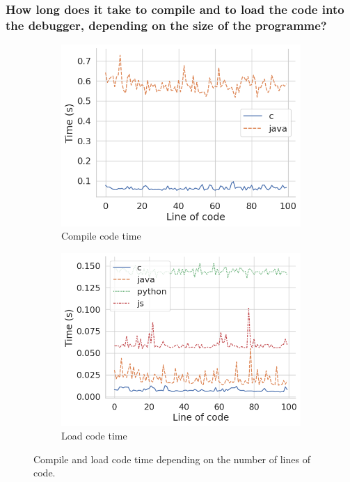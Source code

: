 \documentclass[english,submission]{programming}
\begin{document}
\subsubsection{How long does it take to compile and to load the code into the debugger, depending on the size of the programme?}

\begin{figure}[htbp]
  \centering
  \begin{subfigure}[b]{0.48\textwidth}
      \centering
      \includegraphics[width=\textwidth]{img/compile_code.png}
      \caption{\centering Compile code time}
      \label{subfig:compile}
  \end{subfigure}
  \hfill
  \begin{subfigure}[b]{0.48\textwidth}
      \centering
      \includegraphics[width=\textwidth]{img/load_code.png}
      \caption{\centering Load code time}
      \label{subfig:load}
  \end{subfigure}
  \caption{Compile and load code time depending on the number of lines of code.}
  \label{fig:compileload}
\end{figure}
\end{document}
